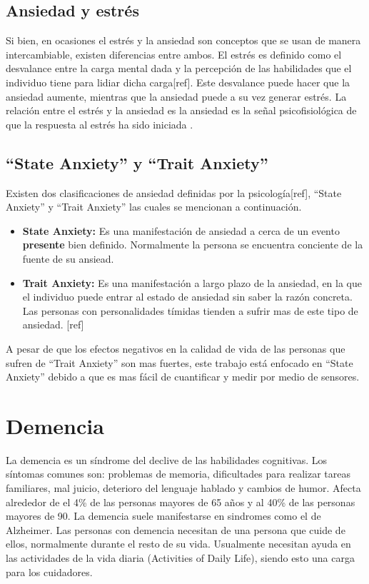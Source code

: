 \subsection{Ansiedad y estr\'es}\label{secc:anxietyandstress}
Si bien, en ocasiones el estr\'es y la ansiedad son conceptos que se usan de manera intercambiable, existen diferencias entre ambos. El estr\'es es definido como el desvalance entre la carga mental dada y la percepci\'on de las habilidades que el individuo tiene para lidiar dicha carga[ref]. Este desvalance puede hacer que la ansiedad aumente, mientras que la ansiedad puede a su vez generar estr\'es. La relaci\'on entre el estr\'es y la ansiedad es la ansiedad es la se\~nal psicofisiol\'ogica de que la respuesta al estr\'es ha sido iniciada \citep{PMID2235645}.


\subsection{``State Anxiety'' y ``Trait Anxiety''}\label{secc:anxieystatevstrait}
Existen dos clasificaciones de ansiedad definidas por la psicolog\'ia[ref], ``State Anxiety'' y ``Trait Anxiety'' las cuales se mencionan a continuaci\'on.

\begin{itemize}
	\item{\textbf{State Anxiety:}} Es una manifestaci\'on de ansiedad a cerca de un evento \textbf{presente} bien definido. Normalmente la persona se encuentra conciente de la fuente de su ansiead. 
	\item{\textbf{Trait Anxiety:}} Es una manifestaci\'on a largo plazo de la ansiedad, en la que el individuo puede entrar al estado de ansiedad sin saber la raz\'on concreta. Las personas con personalidades t\'imidas tienden a sufrir mas de este tipo de ansiedad. [ref]

\end{itemize}

A pesar de que los efectos negativos en la calidad de vida de las personas que sufren de ``Trait Anxiety'' son mas fuertes, este trabajo est\'a enfocado en ``State Anxiety'' debido a que es mas f\'acil de cuantificar y medir por medio de sensores.

\section{Demencia}\label{secc:dementia}
La demencia es un s\'indrome del declive de las habilidades cognitivas. Los s\'intomas comunes son: problemas de memoria, dificultades para realizar tareas familiares, mal juicio, deterioro del lenguaje hablado y cambios de humor\citep{Aziz}. Afecta alrededor de el 4\% de las personas mayores de 65 a\~nos y al 40\% de las personas mayores de 90. La demencia suele manifestarse en sindromes como el de Alzheimer. Las personas con demencia necesitan de una persona que cuide de ellos, normalmente durante el resto de su vida. Usualmente necesitan ayuda en las actividades de la vida diaria (Activities of Daily Life), siendo esto una carga para los cuidadores.

